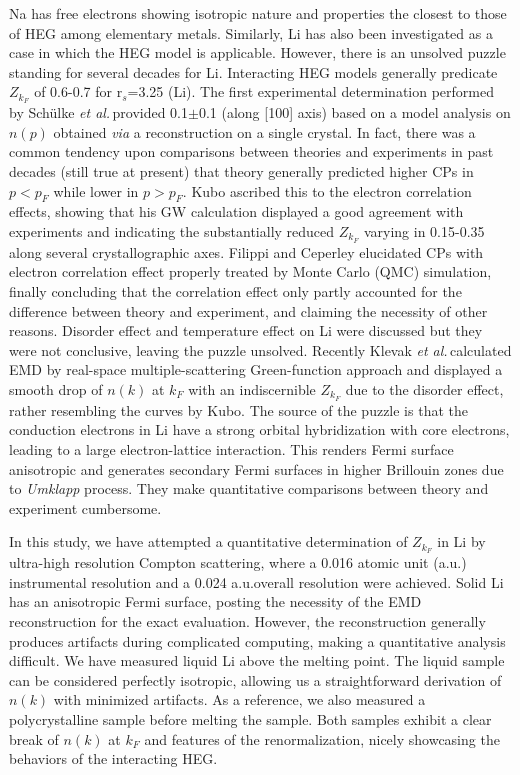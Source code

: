 \documentclass[twocolumn,showpacs,showkeys,fleqn,prl,superscriptaddress]{revtex4}%
\newcommand{\ii}[1]{\textit{#1}}
\begin{document}
Na has free electrons showing isotropic nature and properties the closest to those of HEG among elementary metals.
Similarly, Li has also been investigated as a case in which the HEG model is applicable.
However, there is an unsolved puzzle standing for several decades for Li. 
Interacting HEG models generally predicate $Z_{k_F}$ of 0.6-0.7 for r$_s$=3.25 (Li).
The first experimental determination performed by Sch{\"u}lke \ii{et al.}\,provided 0.1$\pm$0.1 (along [100] axis) based on a model analysis on $n(p)$ obtained \ii{via} a reconstruction on a single crystal\cite{schulke96}. 
In fact, there was a common tendency upon comparisons between theories and experiments in past decades (still true at present) that theory generally predicted higher CPs in $p<p_F$ while lower in $p>p_F$\cite{saku95}. 
Kubo ascribed this to the electron correlation effects, showing that his GW calculation displayed a good agreement with experiments and indicating the substantially reduced $Z_{k_F}$ varying in 0.15-0.35 along several crystallographic axes\cite{kubo95,kubo97}.
Filippi and Ceperley elucidated CPs with electron correlation effect properly treated by Monte Carlo (QMC) simulation, finally concluding that the correlation effect only partly accounted for the difference between theory and experiment, and claiming the necessity of other reasons\cite{filippi99}.  
Disorder effect\cite{dugdale98} and temperature effect on Li\cite{stern01} were discussed but they were not conclusive, leaving the puzzle unsolved.
Recently Klevak \ii{et al.}\,calculated EMD by real-space multiple-scattering Green-function approach and displayed a smooth drop of $n(k)$ at $k_F$ with an indiscernible $Z_{k_F}$ due to the disorder effect, rather resembling the curves by Kubo\cite{klevak16}.  
The source of the puzzle is that the conduction electrons in Li have a strong orbital hybridization with core electrons, leading to a large electron-lattice interaction.
This renders Fermi surface anisotropic and generates secondary Fermi surfaces in higher Brillouin zones due to {\it{Umklapp}} process.
They make quantitative comparisons between theory and experiment cumbersome. 

In this study, we have attempted a quantitative determination of $Z_{k_F}$ in Li by ultra-high resolution Compton scattering, where a 0.016 atomic unit (a.u.) instrumental resolution and a 0.024 a.u.\;overall resolution were achieved.
Solid Li has an anisotropic Fermi surface, posting the necessity of the EMD reconstruction for the exact evaluation. 
However, the reconstruction generally produces artifacts during complicated computing, making a quantitative analysis difficult.
We have measured liquid Li above the melting point.
The liquid sample can be considered perfectly isotropic, allowing us a straightforward derivation of $n(k)$ with minimized artifacts.
As a reference, we also measured a polycrystalline sample before melting the sample.
Both samples exhibit a clear break of $n(k)$ at $k_F$ and features of the renormalization, nicely showcasing the behaviors of the interacting HEG\cite{holz11}.
\end{document}
